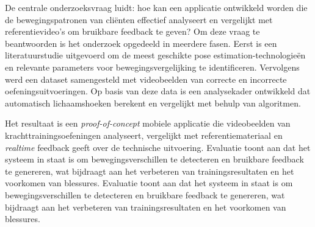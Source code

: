 \medskip

De centrale onderzoeksvraag luidt: hoe kan een applicatie ontwikkeld worden die de bewegingspatronen van cliënten effectief analyseert en vergelijkt met referentievideo’s om bruikbare feedback te geven? Om deze vraag te beantwoorden is het onderzoek opgedeeld in meerdere fasen. 
Eerst is een literatuurstudie uitgevoerd om de meest geschikte pose estimation-technologieën en relevante parameters voor bewegingsvergelijking te identificeren. 
Vervolgens werd een dataset samengesteld met videobeelden van correcte en incorrecte oefeningsuitvoeringen. 
Op basis van deze data is een analysekader ontwikkeld dat automatisch lichaamshoeken berekent en vergelijkt met behulp van algoritmen.

\medskip

Het resultaat is een \textit{proof-of-concept} mobiele applicatie die videobeelden van krachttrainingsoefeningen analyseert, vergelijkt met referentiemateriaal en \textit{realtime} feedback geeft over de technische uitvoering. Evaluatie toont aan dat het systeem in staat is om bewegingsverschillen te detecteren en bruikbare feedback te genereren, wat bijdraagt aan het verbeteren van trainingsresultaten en het voorkomen van blessures.
Evaluatie toont aan dat het systeem in staat is om bewegingsverschillen te detecteren en bruikbare feedback te genereren, wat bijdraagt aan het verbeteren van trainingsresultaten en het voorkomen van blessures.

